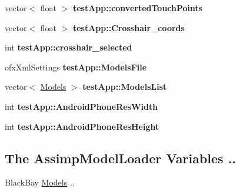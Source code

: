 \begin{DoxyCompactItemize}
\item 
\hypertarget{group___int_variables_ga4764bd1bead24898cc3858707ee14ed9}{vector$<$ float $>$ {\bfseries test\-App\-::converted\-Touch\-Points}}\label{group___int_variables_ga4764bd1bead24898cc3858707ee14ed9}

\item 
\hypertarget{group___int_variables_ga0d9a8da39f01ebe05efbaef7dc2744ea}{vector$<$ float $>$ {\bfseries test\-App\-::\-Crosshair\-\_\-coords}}\label{group___int_variables_ga0d9a8da39f01ebe05efbaef7dc2744ea}

\item 
\hypertarget{group___int_variables_gabd2b58403a31a721e2201c3012d3b4e3}{int {\bfseries test\-App\-::crosshair\-\_\-selected}}\label{group___int_variables_gabd2b58403a31a721e2201c3012d3b4e3}

\item 
\hypertarget{group___int_variables_gaa20473a935d49170d16dd7da21124056}{ofx\-Xml\-Settings {\bfseries test\-App\-::\-Models\-File}}\label{group___int_variables_gaa20473a935d49170d16dd7da21124056}

\item 
\hypertarget{group___int_variables_ga1bfb9be4aa89d5b89983defa2d235113}{vector$<$ \hyperlink{class_models}{Models} $>$ {\bfseries test\-App\-::\-Models\-List}}\label{group___int_variables_ga1bfb9be4aa89d5b89983defa2d235113}

\item 
\hypertarget{group___int_variables_ga4930c7e7ecb7783261349fd2f2e22f8b}{int {\bfseries test\-App\-::\-Android\-Phone\-Res\-Width}}\label{group___int_variables_ga4930c7e7ecb7783261349fd2f2e22f8b}

\item 
\hypertarget{group___int_variables_ga9389fab48c7bd5896f26d494fa238535}{int {\bfseries test\-App\-::\-Android\-Phone\-Res\-Height}}\label{group___int_variables_ga9389fab48c7bd5896f26d494fa238535}

\end{DoxyCompactItemize}
\subsection*{The Assimp\-Model\-Loader Variables ..}
\label{_amgrpf861e8362b5cbec480d32986cd9c6e19}%
Black\-Bay \hyperlink{class_models}{Models} ..

